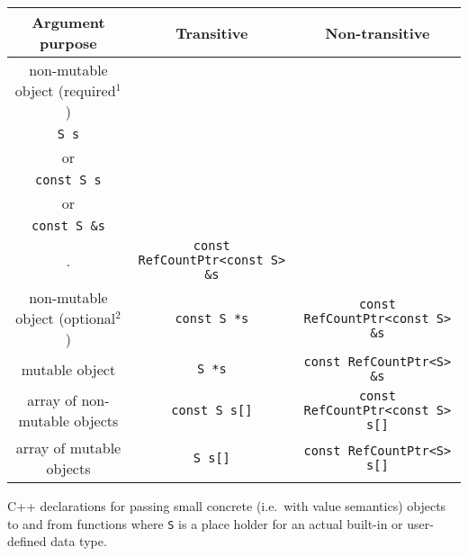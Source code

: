 \documentclass[pdf,ps2pdf,11pt]{SANDreport}
\begin{document}
%
\begin{center}
\begin{minipage}{{}\textwidth}
\begin{tabular}{|c|c|c|}
\hline
Argument purpose
& Transitive
& Non-transitive \\
\hline
\hline
non-mutable object (required$^1$)
& \begin{minipage}{12ex}
    \begin{center}
    {\tiny .}\\
    {}\texttt{S s} \\
    or \\
    {}\texttt{const S s} \\
    or \\
    {}\texttt{const S \&s} \\
    {\tiny .}
    \end{center}
  \end{minipage}
& {}\texttt{const RefCountPtr<const S> \&s} \\
\hline
non-mutable object (optional$^2$)
& {}\texttt{const S *s}
& {}\texttt{const RefCountPtr<const S> \&s} \\
\hline
mutable object
& {}\texttt{S *s}
& {}\texttt{const RefCountPtr<S> \&s} \\
\hline
array of non-mutable objects
& {}\texttt{const S s[]}
& {}\texttt{const RefCountPtr<const S> s[]} \\
\hline
array of mutable objects
& {}\texttt{S s[]}
& {}\texttt{const RefCountPtr<S> s[]} \\
\hline
\end{tabular}
\begin{center}
C++ declarations for passing small concrete (i.e.~with value
semantics) objects to and from functions where {}\texttt{S} is a place
holder for an actual built-in or user-defined data type.
\end{center}
\end{minipage}
\end{center}
%
%
\end{document}
